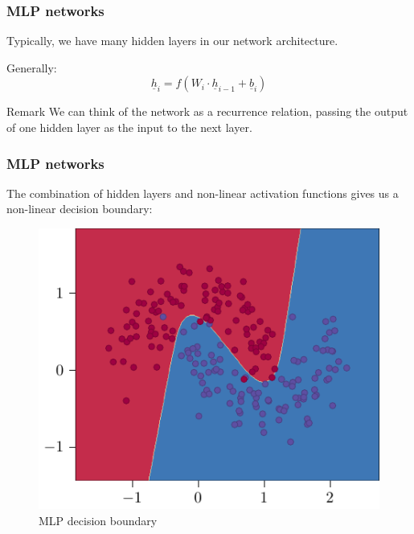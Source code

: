 \documentclass{beamer}
\begin{document}

\begin{frame}
    \frametitle{MLP networks}
    Typically, we have many hidden layers in our network architecture.
    \vspace{0.5cm}

    Generally:
    \[\underline{h}_i = f(W_i \cdot \underline{h}_{i - 1} + \underline{b}_i)\] \pause
    \begin{block}{Remark}
        We can think of the network as a recurrence relation, passing the output of one hidden layer as the input to the next layer.
    \end{block}
\end{frame}

\begin{frame}
    \frametitle{MLP networks}
    The combination of \alert{hidden layers} and \alert{non-linear activation functions} gives us a \alert{non-linear decision boundary}:
    \begin{figure}
        \centering
        \includegraphics[height=0.6\textheight]{figures/non-linear-boundary/main.pdf}
        \caption{MLP decision boundary}
    \end{figure}
\end{frame}
\end{document}
